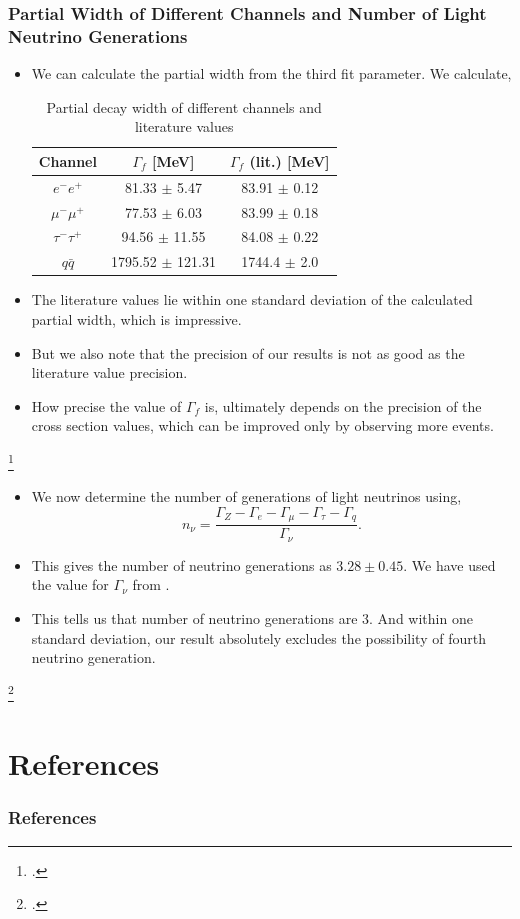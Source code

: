 \documentclass[10pt]{beamer}
\begin{document}
\begin{frame}
\frametitle{Partial Width of Different Channels and Number of Light Neutrino Generations}
\begin{itemize}
  \item We can calculate the partial width from the third fit parameter. We calculate,
  \begin{table}[h!]
    \centering
    \begin{tabular}{c|cc}
    \hline
    Channel        & $\Gamma_f$ {[}MeV{]} & $\Gamma_f$ (lit.) {[}MeV{]} \\ \hline
    $e^-e^+$       & 81.33 $\pm$ 5.47     & 83.91 $\pm$ 0.12              \\
    $\mu^-\mu^+$   & 77.53 $\pm$ 6.03     & 83.99 $\pm$ 0.18              \\
    $\tau^-\tau^+$ & 94.56 $\pm$ 11.55    & 84.08 $\pm$ 0.22              \\
    $q\bar{q}$     & 1795.52 $\pm$ 121.31 & 1744.4 $\pm$ 2.0              \\ \hline
    \end{tabular}
    \caption{Partial decay width of different channels and literature values}
    \label{table:decaywidth}
  \end{table}
  \item The literature values \footnotemark{} lie within one standard deviation of the calculated partial width, which is impressive.
  \item But we also note that the precision of our results is not as good as the literature value precision.
  \item How precise the value of $\Gamma_f$ is, ultimately depends on the precision of the cross section values, which can be improved only by observing more events.
\end{itemize}
\footcitetext{pdg2}
\end{frame}

\begin{frame}
\begin{itemize}
  \item We now determine the number of generations of light neutrinos using,
  \begin{equation}
    n_{\nu} = \frac{\Gamma_Z - \Gamma_e - \Gamma_{\mu} - \Gamma_{\tau} - \Gamma_q}{\Gamma_{\nu}}.
  \end{equation}
  \item This gives the number of neutrino generations as $3.28 \pm 0.45$. We have used the value for $\Gamma_{\nu}$ from \footnotemark{}.
  \item This tells us that number of neutrino generations are $3$. And within one standard deviation, our result absolutely excludes the possibility of fourth neutrino generation.
\end{itemize}
\footcitetext{UB}
\end{frame}

\section*{References}
\begin{frame}
\frametitle{References}
\printbibliography
\end{frame}
\end{document}
